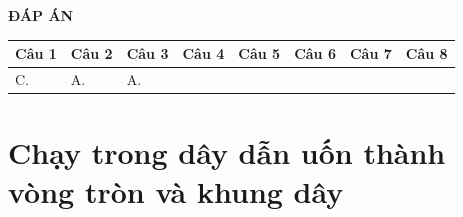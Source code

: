 \textbf{ĐÁP ÁN}
\begin{longtable}[\textwidth]{|p{}|p{}|p{}|p{}|p{}|p{}|p{}|p{}|}
	\hline%
	\multicolumn{1}{|c}{\textbf{Câu 1}} & \multicolumn{1}{|c|}{\textbf{Câu 2}} & \multicolumn{1}{c|}{\textbf{Câu 3}} &
	\multicolumn{1}{c|}{\textbf{Câu 4}} &
	\multicolumn{1}{c|}{\textbf{Câu 5}} &
	\multicolumn{1}{c|}{\textbf{Câu 6}} &
	\multicolumn{1}{c|}{\textbf{Câu 7}} &
	\multicolumn{1}{c|}{\textbf{Câu 8}} \\
	\hline
	C.&A. &A. & & & & &\\
	\hline
\end{longtable}

\section{Chạy trong dây dẫn uốn thành vòng tròn và khung dây}
